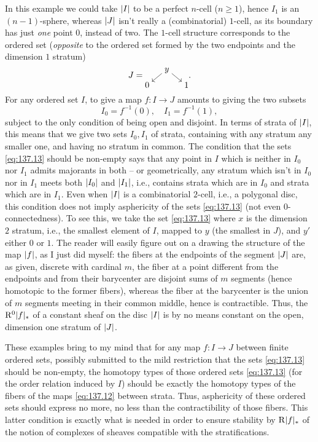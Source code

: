 \begin{remarks}
  In this example we could take $\lvert I\rvert$ to be a perfect $n$-cell
  ($n\ge1$), hence $I_1$ is an $(n-1)$-sphere, whereas $\lvert J\rvert$ isn't
  really a (combinatorial) $1$-cell, as its boundary has just
  \emph{one} point $0$, instead of two. The $1$-cell structure
  corresponds to the ordered set (\emph{opposite} to the ordered set
  formed by the two endpoints and the dimension $1$ stratum)
  \[J =
    \begin{tikzcd}[row sep=tiny,column sep=small,cramped]
      & y\ar[dl]\ar[dr] & \\
      0 & & 1
    \end{tikzcd}.\]
  For any ordered set $I$, to give a map $f:I\to J$ amounts to giving
  the two subsets
  \[I_0=f^{-1}(0), \quad I_1=f^{-1}(1),\]
  subject to the only condition of being open and disjoint. In terms
  of strata of $\lvert I\rvert$, this means that we give two sets $I_0,I_1$ of
  strata, containing with any stratum any smaller one, and having no
  stratum in common. The condition that the sets \eqref{eq:137.13}
  should be non-empty says that any point in $I$ which is neither in
  $I_0$ nor $I_1$ admits majorants in both -- or geometrically, any
  stratum which isn't in $I_0$ nor in $I_1$ meets both $\lvert I_0\rvert$ and
  $\lvert I_1\rvert$, i.e., contains strata which are in $I_0$ and strata
  which are in $I_1$. Even when $\lvert I\rvert$ is a combinatorial $2$-cell,
  i.e., a polygonal disc, this condition does not imply asphericity of
  the sets \eqref{eq:137.13} (not even $0$-connectedness). To see
  this, we take the set \eqref{eq:137.13} where $x$ is the dimension
  $2$ stratum, i.e., the smallest element of $I$, mapped to $y$ (the
  smallest in $J$), and $y'$ either $0$ or $1$. The reader will easily
  figure out on a drawing the structure of the map $\lvert f\rvert$, as I just
  did myself: the fibers at the endpoints of the segment $\lvert J\rvert$ are,
  as given, discrete with cardinal $m$, the fiber at a point different
  from the endpoints and from their barycenter are disjoint sums of
  $m$ segments (hence homotopic to the former fibers), whereas the
  fiber at the barycenter is the union of $m$ segments meeting in
  their common middle, hence is contractible. Thus, the
  $\mathrm R^0\lvert f\rvert_*$ of a constant sheaf on the disc $\lvert I\rvert$ is by
  no means constant on the open, dimension one stratum of $\lvert J\rvert$.

  These examples bring to my mind that for any map $f:I\to J$ between
  finite ordered sets, possibly submitted to the mild restriction that
  the sets \eqref{eq:137.13} should be non-empty, the homotopy types
  of those ordered sets \eqref{eq:137.13} (for the order relation
  induced by $I$) should be exactly the homotopy types of the fibers
  of the maps \eqref{eq:137.12} between strata. Thus, asphericity of
  these ordered sets should express no more, no less than the
  contractibility of those fibers. This latter condition is exactly
  what is needed in order to ensure stability by $\mathrm R\lvert f\rvert_*$
  of the notion of complexes of sheaves compatible with the
  stratifications. 
\end{remarks}

